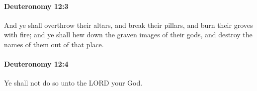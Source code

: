 		\paragraph{Deuteronomy 12:3} %
			\label{DEUTERONOMY-12-3}

			And ye shall overthrow their altars, and break their pillars, and burn their groves with fire; and ye shall hew down the graven images of their gods, and destroy the names of them out of that place.


		\paragraph{Deuteronomy 12:4} %
			\label{DEUTERONOMY-12-4}

			Ye shall not do so unto the LORD your God.


